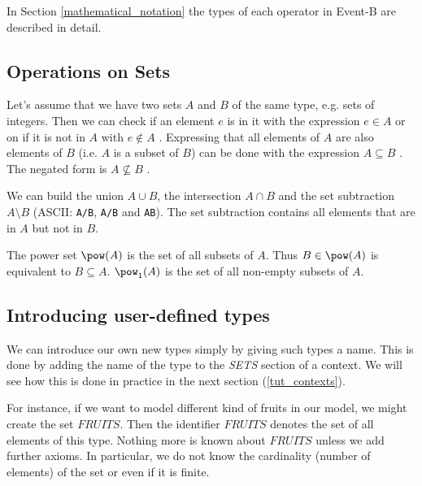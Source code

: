 
In Section \ref{mathematical_notation} the types of each operator in Event-B are described in detail.

\subsection{Operations on Sets}
\label{tut_operations_on_sets}
Let's assume that we have two sets $A$ and $B$ of the same type, e.g. sets of integers.
Then we can check if an element $e$ is in it with the expression $e\in A$  or 
on if it is not in $A$ with $e\notin A$ .
Expressing that all elements of $A$ are also elements of $B$ (i.e. $A$ is a subset of $B$) can
be done with the expression $A\subseteq B$ . The negated form is $A\not\subseteq B$ .

We can build the union $A\cup B$, the intersection $A\cap B$ and the set subtraction $A\setminus B$
(ASCII: \texttt{A\mybackslash{}/B}, \texttt{A/\mybackslash{}B} and \texttt{A\mybackslash{}B}). The
set subtraction contains all elements that are in $A$ but not in $B$.

The power set $\pow(A)$  is the set of all subsets of $A$.
Thus $B\in\pow(A)$ is equivalent to $B\subseteq A$.
$\pow_1(A)$  is the set of all non-empty subsets of $A$.

\subsection{Introducing user-defined types}
\label{tut_user_defined_sets}

We can introduce our own new types simply by giving such types a name.
This is done by adding the name of the type to the \textsl{SETS} section of a context.
We will see how this is done in practice in the next section (\ref{tut_contexts}).

For instance, if we want to model different kind of fruits in our model, we might create the set $FRUITS$. Then the identifier $FRUITS$ denotes the set of all elements of this type. Nothing more is known about $FRUITS$ unless we add further axioms. In particular, we do not
know the cardinality (number of elements) of the set or even if it is finite.

